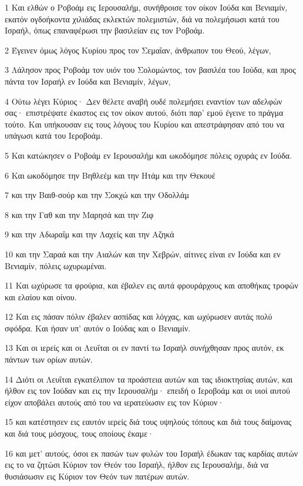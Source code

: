 \par 1 Και ελθών ο Ροβοάμ εις Ιερουσαλήμ, συνήθροισε τον οίκον Ιούδα και Βενιαμίν, εκατόν ογδοήκοντα χιλιάδας εκλεκτών πολεμιστών, διά να πολεμήσωσι κατά του Ισραήλ, όπως επαναφέρωσι την βασιλείαν εις τον Ροβοάμ.
\par 2 Έγεινεν όμως λόγος Κυρίου προς τον Σεμαΐαν, άνθρωπον του Θεού, λέγων,
\par 3 Λάλησον προς Ροβοάμ τον υιόν του Σολομώντος, τον βασιλέα του Ιούδα, και προς πάντα τον Ισραήλ εν Ιούδα και Βενιαμίν, λέγων,
\par 4 Ούτω λέγει Κύριος· Δεν θέλετε αναβή ουδέ πολεμήσει εναντίον των αδελφών σας· επιστρέψατε έκαστος εις τον οίκον αυτού, διότι παρ' εμού έγεινε το πράγμα τούτο. Και υπήκουσαν εις τους λόγους του Κυρίου και απεστράφησαν από του να υπάγωσι κατά του Ιεροβοάμ.
\par 5 Και κατώκησεν ο Ροβοάμ εν Ιερουσαλήμ και ωκοδόμησε πόλεις οχυράς εν Ιούδα.
\par 6 Και ωκοδόμησε την Βηθλεέμ και την Ητάμ και την Θεκουέ
\par 7 και την Βαιθ-σούρ και την Σοκχώ και την Οδολλάμ
\par 8 και την Γαθ και την Μαρησά και την Ζιφ
\par 9 και την Αδωραΐμ και την Λαχείς και την Αζηκά
\par 10 και την Σαραά και την Αιαλών και την Χεβρών, αίτινες είναι εν Ιούδα και εν Βενιαμίν, πόλεις ωχυρωμέναι.
\par 11 Και ωχύρωσε τα φρούρια, και έβαλεν εις αυτά φρουράρχους και αποθήκας τροφών και ελαίου και οίνου.
\par 12 Και εις πάσαν πόλιν έβαλεν ασπίδας και λόγχας, και ωχύρωσεν αυτάς πολύ σφόδρα. Και ήσαν υπ' αυτόν ο Ιούδας και ο Βενιαμίν.
\par 13 Και οι ιερείς και οι Λευΐται οι εν παντί τω Ισραήλ συνήχθησαν προς αυτόν, εκ πάντων των ορίων αυτών.
\par 14 Διότι οι Λευΐται εγκατέλιπον τα προάστεια αυτών και τας ιδιοκτησίας αυτών, και ήλθον εις τον Ιούδαν και εις την Ιερουσαλήμ· επειδή ο Ιεροβοάμ και οι υιοί αυτού είχον αποβάλει αυτούς από του να ιερατεύωσιν εις τον Κύριον·
\par 15 και κατέστησεν εις εαυτόν ιερείς διά τους υψηλούς τόπους και διά τους δαίμονας και διά τους μόσχους, τους οποίους έκαμε·
\par 16 και μετ' αυτούς, όσοι εκ πασών των φυλών του Ισραήλ έδωκαν τας καρδίας αυτών εις το να ζητώσι Κύριον τον Θεόν του Ισραήλ, ήλθον εις Ιερουσαλήμ, διά να θυσιάσωσιν εις Κύριον τον Θεόν των πατέρων αυτών.
